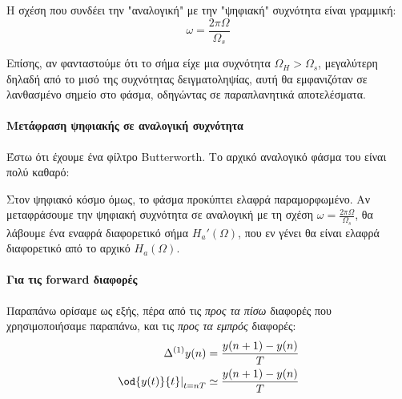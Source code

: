 \documentclass[11pt,a4paper,notitlepage,fleqn]{article}
\begin{document}
Η σχέση που συνδέει την "αναλογική" με την "ψηφιακή" συχνότητα είναι γραμμική:
\[
\boxed{\omega = \frac{2πΩ}{Ω_s}}
\]

Επίσης, αν φανταστούμε ότι το σήμα είχε μια συχνότητα \( Ω_H > \Omega_s \), μεγαλύτερη δηλαδή από το
μισό της συχνότητας δειγματοληψίας, αυτή θα εμφανιζόταν σε λανθασμένο σημείο στο φάσμα, οδηγώντας
σε παραπλανητικά αποτελέσματα.

\paragraph{Μετάφραση ψηφιακής σε αναλογική συχνότητα}
Έστω ότι έχουμε ένα φίλτρο Butterworth. Το αρχικό αναλογικό φάσμα του είναι πολύ καθαρό:


Στον ψηφιακό κόσμο όμως, το φάσμα προκύπτει ελαφρά παραμορφωμένο. Αν μεταφράσουμε την ψηφιακή συχνότητα
σε αναλογική με τη σχέση \( ω = \frac{2πΩ}{Ω_s} \), θα λάβουμε ένα εναφρά διαφορετικό σήμα \( H_a'(Ω) \),
που εν γένει θα είναι ελαφρά διαφορετικό από το αρχικό \( H_a(Ω) \).

\paragraph{Για τις forward διαφορές}
Παραπάνω ορίσαμε ως εξής, πέρα από τις \emph{προς τα πίσω} διαφορές που χρησιμοποιήσαμε παραπάνω,
και τις \emph{προς τα εμπρός} διαφορές:
\begin{align*}
\Delta^{(1)} y(n) &= \frac{y(n+1)-y(n)}{T} \\
\left. \od{y(t)}{t} \right|_{t=nT} &\simeq \frac{y(n+1)-y(n)}{T}
\end{align*}
\end{document}
